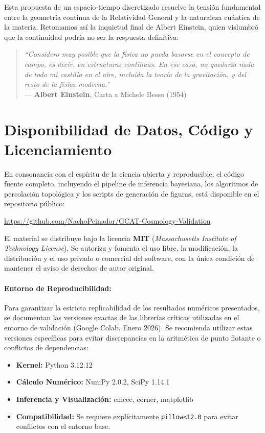 \documentclass[12pt, a4paper]{article}
\theoremstyle{plain}
\theoremstyle{definition}
\begin{document}
Esta propuesta de un espacio-tiempo discretizado resuelve la tensión fundamental entre la geometría continua de la Relatividad General y la naturaleza cuántica de la materia. Retomamos así la inquietud final de Albert Einstein, quien vislumbró que la continuidad podría no ser la respuesta definitiva:

\begin{quote}
\textit{``Considero muy posible que la física no pueda basarse en el concepto de campo, es decir, en estructuras continuas. En ese caso, no quedaría nada de todo mi castillo en el aire, incluida la teoría de la gravitación, y del resto de la física moderna.''} \\
--- \textbf{Albert Einstein}, Carta a Michele Besso (1954)
\end{quote}

\section*{Disponibilidad de Datos, Código y Licenciamiento}

En consonancia con el espíritu de la ciencia abierta y reproducible, el código fuente completo, incluyendo el pipeline de inferencia bayesiana, los algoritmos de percolación topológica y los scripts de generación de figuras, está disponible en el repositorio público:

\begin{center}
\url{https://github.com/NachoPeinador/GCAT-Cosmology-Validation}
\end{center}

El material se distribuye bajo la licencia \textbf{MIT} (\textit{Massachusetts Institute of Technology License}). Se autoriza y fomenta el uso libre, la modificación, la distribución y el uso privado o comercial del software, con la única condición de mantener el aviso de derechos de autor original.

\paragraph{Entorno de Reproducibilidad:}
Para garantizar la estricta replicabilidad de los resultados numéricos presentados, se documentan las versiones exactas de las librerías críticas utilizadas en el entorno de validación (Google Colab, Enero 2026). Se recomienda utilizar estas versiones específicas para evitar discrepancias en la aritmética de punto flotante o conflictos de dependencias:
\begin{itemize}
    \item \textbf{Kernel:} Python 3.12.12
    \item \textbf{Cálculo Numérico:} NumPy 2.0.2, SciPy 1.14.1
    \item \textbf{Inferencia y Visualización:} emcee, corner, matplotlib
    \item \textbf{Compatibilidad:} Se requiere explícitamente \texttt{pillow<12.0} para evitar conflictos con el entorno base.
\end{itemize}
\end{document}
